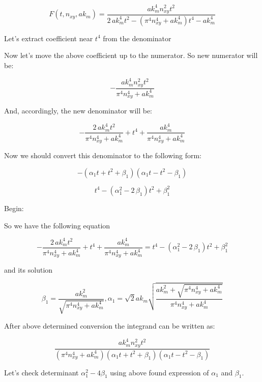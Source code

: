 \documentclass[11pt]{article}
\begin{document}
\[F\left(t, n_{xy}, ak_m\right) = \frac{\mathit{ak}_{m}^{4} n_{\mathit{xy}}^{2} t^{2}}{2 \, \mathit{ak}_{m}^{4} t^{2} - {\left(\pi^{4} n_{\mathit{xy}}^{4} + \mathit{ak}_{m}^{4}\right)} t^{4} - \mathit{ak}_{m}^{4}}\]

    Let's extract coefficient near \(t^4\) from the denominator

    Now let's move the above coefficient up to the numerator. So new
numerator will be:

    \[-\frac{\mathit{ak}_{m}^{4} n_{\mathit{xy}}^{2} t^{2}}{\pi^{4} n_{\mathit{xy}}^{4} + \mathit{ak}_{m}^{4}}\]

    And, accordingly, the new denominator will be:

    \[-\frac{2 \, \mathit{ak}_{m}^{4} t^{2}}{\pi^{4} n_{\mathit{xy}}^{4} + \mathit{ak}_{m}^{4}} + t^{4} + \frac{\mathit{ak}_{m}^{4}}{\pi^{4} n_{\mathit{xy}}^{4} + \mathit{ak}_{m}^{4}}\]

    Now we should convert this denominator to the following form:

    \[-{\left(\alpha_{1} t + t^{2} + \beta_{1}\right)} {\left(\alpha_{1} t - t^{2} - \beta_{1}\right)}\]

\[t^{4} - {\left(\alpha_{1}^{2} - 2 \, \beta_{1}\right)} t^{2} + \beta_{1}^{2}\]

    Begin:

    So we have the following equation

\[-\frac{2 \, \mathit{ak}_{m}^{4} t^{2}}{\pi^{4} n_{\mathit{xy}}^{4} + \mathit{ak}_{m}^{4}} + t^{4} + \frac{\mathit{ak}_{m}^{4}}{\pi^{4} n_{\mathit{xy}}^{4} + \mathit{ak}_{m}^{4}} = t^{4} - {\left(\alpha_{1}^{2} - 2 \, \beta_{1}\right)} t^{2} + \beta_{1}^{2}\]

and its solution

\[\beta_{1} = \frac{\mathit{ak}_{m}^{2}}{\sqrt{\pi^{4} n_{\mathit{xy}}^{4} + \mathit{ak}_{m}^{4}}}, \alpha_{1} = \sqrt{2} \mathit{ak}_{m} \sqrt{\frac{\mathit{ak}_{m}^{2} + \sqrt{\pi^{4} n_{\mathit{xy}}^{4} + \mathit{ak}_{m}^{4}}}{\pi^{4} n_{\mathit{xy}}^{4} + \mathit{ak}_{m}^{4}}}\]

    After above determined conversion the integrand can be written as:

    \[\frac{\mathit{ak}_{m}^{4} n_{\mathit{xy}}^{2} t^{2}}{{\left(\pi^{4} n_{\mathit{xy}}^{4} + \mathit{ak}_{m}^{4}\right)} {\left(\alpha_{1} t + t^{2} + \beta_{1}\right)} {\left(\alpha_{1} t - t^{2} - \beta_{1}\right)}}\]

    Let's check determinant \(\alpha_1^2 - 4\beta_1\) using above found
expression of \(\alpha_1\) and \(\beta_1\).
\end{document}
